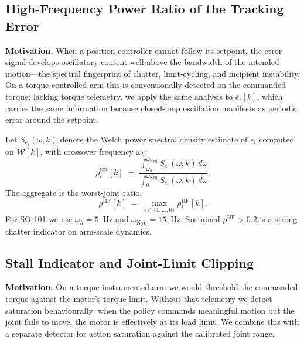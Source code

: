 \subsection{High-Frequency Power Ratio of the Tracking Error}

\textbf{Motivation.} When a position controller cannot follow its setpoint,
the error signal develops oscillatory content well above the bandwidth of the
intended motion---the spectral fingerprint of chatter, limit-cycling, and
incipient instability. On a torque-controlled arm this is conventionally
detected on the commanded torque; lacking torque telemetry, we apply the same
analysis to $e_i[k]$, which carries the same information because closed-loop
oscillation manifests as periodic error around the setpoint.

Let $S_{e_i}(\omega, k)$ denote the Welch power spectral density estimate of
$e_i$ computed on $\mathcal{W}[k]$, with crossover frequency $\omega_h$:
\begin{equation}
    \rho_i^{\mathrm{HF}}[k]
    \;=\;
    \frac{\displaystyle \int_{\omega_h}^{\omega_{\mathrm{Nyq}}} S_{e_i}(\omega, k)\, d\omega}{\displaystyle \int_{0}^{\omega_{\mathrm{Nyq}}} S_{e_i}(\omega, k)\, d\omega}.
\end{equation}
The aggregate is the worst-joint ratio,
\begin{equation}
    \rho^{\mathrm{HF}}[k] \;=\; \max_{i \in \{1,\ldots,6\}} \rho_i^{\mathrm{HF}}[k].
\end{equation}
For SO-101 we use $\omega_h = 5$~Hz and $\omega_{\mathrm{Nyq}} = 15$~Hz.
Sustained $\rho^{\mathrm{HF}} > 0.2$ is a strong chatter indicator on
arm-scale dynamics.

\subsection{Stall Indicator and Joint-Limit Clipping}

\textbf{Motivation.} On a torque-instrumented arm we would threshold the
commanded torque against the motor's torque limit. Without that telemetry we
detect saturation behaviourally: when the policy commands meaningful motion
but the joint fails to move, the motor is effectively at its load limit. We
combine this with a separate detector for action saturation against the
calibrated joint range.

